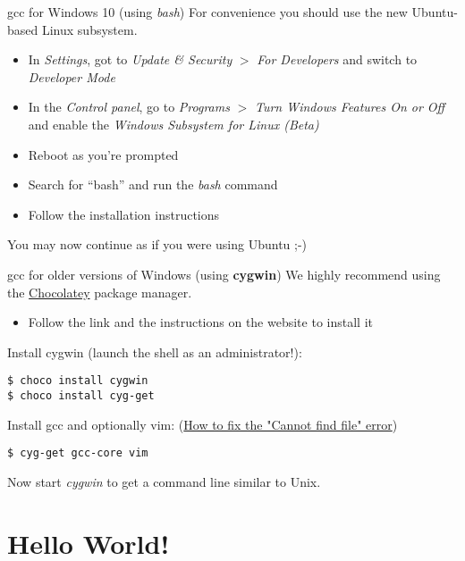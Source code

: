 \documentclass[10pt,graphics,aspectratio=169,table]{beamer}
\begin{document}
\begin{frame}{gcc for Windows 10 (using \textit{bash})}
	For convenience you should use the new Ubuntu-based Linux subsystem.\\
	\bigskip
	\begin{itemize}
		\item In \textit{Settings}, got to \textit{Update \& Security} $>$ \textit{For Developers}
			and switch to \textit{Developer Mode}
		\item In the \textit{Control panel}, go to \textit{Programs} $>$ \textit{Turn Windows Features On or Off}
			and enable the \textit{Windows Subsystem for Linux (Beta)}
		\item Reboot as you're prompted
		\item Search for ``bash'' and run the \textit{bash} command
		\item Follow the installation instructions
	\end{itemize}
	\bigskip
	You may now continue as if you were using Ubuntu ;-)
\end{frame}

\begin{frame}[fragile]{gcc for older versions of Windows (using \textbf{cygwin})}
	We highly recommend using the \href{https://chocolatey.org/}{Chocolatey} package manager.\\
	\begin{itemize}
		\item Follow the link and the instructions on the website to install it
	\end{itemize}
	\bigskip
	Install cygwin (launch the shell as an administrator!):
	\begin{lstlisting}[numbers=none]
$ choco install cygwin
$ choco install cyg-get
\end{lstlisting}
	\bigskip
	Install gcc and optionally vim: {\scriptsize(\href{https://github.com/chocolatey/chocolatey-coreteampackages/issues/176#issuecomment-212939458}{How to fix the "Cannot find file" error})}
	\begin{lstlisting}[numbers=none]
$ cyg-get gcc-core vim
\end{lstlisting}
	\bigskip
	Now start \textit{cygwin} to get a command line similar to Unix.
\end{frame}

\section{Hello World!}
\end{document}
